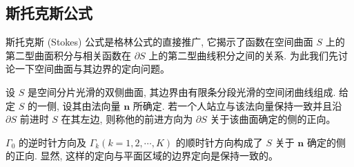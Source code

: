 \documentclass[UTF8,12pt,a4paper,fontset=fandol]{ctexart}
\begin{document}
\subsection{斯托克斯公式}

斯托克斯 (Stokes) 公式是格林公式的直接推广, 它揭示了函数在空间曲面 $S$ 上的第二型曲面积分与相关函数在 $\partial S$ 上的第二型曲线积分之间的关系. 为此我们先讨论一下空间曲面与其边界的定向问题。

设 $S$ 是空间分片光滑的双侧曲面, 其边界由有限条分段光滑的空间闭曲线组成. 给定 $S$ 的一侧, 设其由法向量 $\boldsymbol n$ 所确定. 若一个人站立与该法向量保持一致并且沿 $\partial S$ 前进时 $S$ 在其左边, 则称他的前进方向为 $\partial S$ 关于该曲面确定的侧的正向。

$\Gamma_0$ 的逆时针方向及 $\Gamma_k(k=1,2,\cdots,K)$ 的顺时针方向构成了 $S$ 关于 $\boldsymbol n$ 确定的侧的正向. 显然, 这样的定向与平面区域的边界定向是保持一致的。
\end{document}
